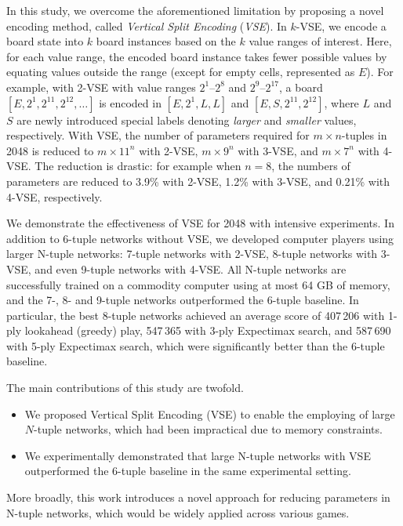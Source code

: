 In this study, we overcome the aforementioned limitation by proposing a novel encoding method, called \emph{Vertical Split Encoding} (\emph{VSE}). In $k$-VSE, we encode a board state into $k$ board instances based on the $k$ value ranges of interest. Here, for each value range, the encoded board instance takes fewer possible values by equating values outside the range (except for empty cells, represented as $E$).
For example, with 2-VSE with value ranges $2^1$--$2^8$ and $2^9$--$2^{17}$, a board $[E, 2^1, 2^{11}, 2^{12}, \ldots]$ is encoded in $[E, 2^1, L, L]$ and $[E, S, 2^{11}, 2^{12}]$, where $L$ and $S$ are newly introduced special labels denoting \emph{larger} and \emph{smaller} values, respectively.
With VSE, the number of parameters required for $m$\,$\times$\,$n$-tuples in 2048 is reduced to $m\times 11^n$ with 2-VSE, $m\times 9^n$ with 3-VSE, and $m\times 7^n$ with 4-VSE. The reduction is drastic: for example when $n=8$, the numbers of parameters are reduced to 3.9\% with 2-VSE, 1.2\% with 3-VSE, and 0.21\% with 4-VSE, respectively.


We demonstrate the effectiveness of VSE for 2048 with intensive experiments.
In addition to 6-tuple networks without VSE, we developed computer players using larger N-tuple networks: 7-tuple networks with 2-VSE, 8-tuple networks with 3-VSE, and even 9-tuple networks with 4-VSE.
All N-tuple networks are successfully trained on a commodity computer using at most 64 GB of memory, and the 7-, 8- and 9-tuple networks outperformed the 6-tuple baseline.
In particular, the best 8-tuple networks achieved an average score of 407\,206 with 1-ply lookahead (greedy) play, 547\,365 with 3-ply Expectimax search, and 587\,690 with 5-ply Expectimax search, which were significantly better than the 6-tuple baseline.



The main contributions of this study are twofold.
\begin{itemize}
 \item We proposed Vertical Split Encoding (VSE) to enable the employing of large $N$-tuple networks, which had been impractical due to memory constraints.
 \item We experimentally demonstrated that large N-tuple networks with VSE outperformed the 6-tuple baseline in the same experimental setting.
\end{itemize}
More broadly, this work introduces a novel approach for reducing parameters in N-tuple networks, which would be widely applied across various games.

